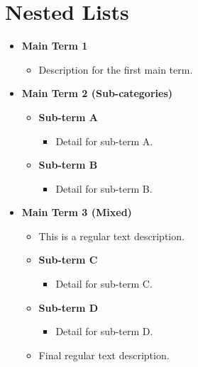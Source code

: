\documentclass[11pt,a4paper]{article}
\begin{document}
\section{Nested Lists}

\begin{itemize}
\item \textbf{Main Term 1}
  \begin{itemize}
\item Description for the first main term.
  \end{itemize}
\item \textbf{Main Term 2 (Sub-categories)}
  \begin{itemize}
\item \textbf{Sub-term A}
    \begin{itemize}
\item Detail for sub-term A.
    \end{itemize}
\item \textbf{Sub-term B}
    \begin{itemize}
\item Detail for sub-term B.
    \end{itemize}
  \end{itemize}
\item \textbf{Main Term 3 (Mixed)}
  \begin{itemize}
\item This is a regular text description.
\item \textbf{Sub-term C}
    \begin{itemize}
\item Detail for sub-term C.
    \end{itemize}
\item \textbf{Sub-term D}
    \begin{itemize}
\item Detail for sub-term D.
    \end{itemize}
\item Final regular text description.
  \end{itemize}
\end{itemize}
\end{document}
